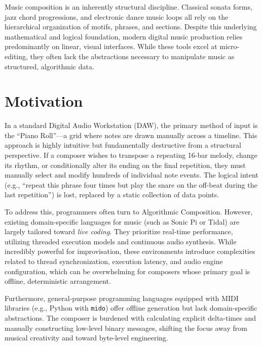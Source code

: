 

Music composition is an inherently structural discipline.
Classical sonata forms, jazz chord progressions,
and electronic dance music loops all rely on the hierarchical organization of motifs, phrases, and sections.
Despite this underlying mathematical and logical foundation, modern digital music production relies
predominantly on linear, visual interfaces.
While these tools excel at micro-editing, they often lack the abstractions necessary to manipulate music as structured,
algorithmic data.

\section{Motivation}\label{detail-sec:motivation}

In a standard Digital Audio Workstation (DAW), the primary method of input is the ``Piano Roll''---a grid
where notes are
drawn manually across a timeline.
This approach is highly intuitive but fundamentally destructive from a structural perspective.
If a composer wishes to transpose a repeating 16-bar melody, change its rhythm, or conditionally alter its ending on the
final repetition, they must manually select and modify hundreds of individual note events.
The logical intent (e.g., ``repeat this phrase four times but play the snare on the off-beat during the last
repetition'') is lost, replaced by a static collection of data points.

To address this, programmers often turn to Algorithmic Composition.
However, existing domain-specific languages for music (such as Sonic Pi or Tidal) are largely tailored toward
\textit{live coding}.
They prioritize real-time performance, utilizing threaded execution models and continuous audio synthesis.
While incredibly powerful for improvisation, these environments introduce complexities related to thread
synchronization, execution latency, and audio engine configuration, which can be overwhelming for composers whose
primary goal is offline, deterministic arrangement.

Furthermore, general-purpose programming languages equipped with MIDI libraries (e.g., Python with \texttt{mido}) offer
offline generation but lack domain-specific abstractions.
The composer is burdened with calculating explicit delta-times and manually constructing low-level binary messages,
shifting the focus away from musical creativity and toward byte-level engineering.

